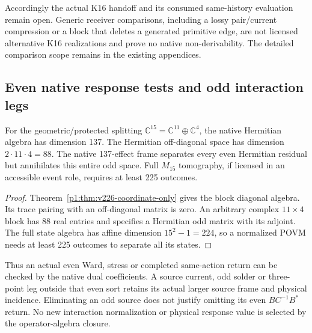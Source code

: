 \documentclass[12pt,a4paper]{article}
\begin{document}
Accordingly the actual K16 handoff and its consumed same-history evaluation
remain open. Generic receiver comparisons, including a lossy pair/current
compression or a block that deletes a generated primitive edge, are not
licensed alternative K16 realizations and prove no native non-derivability.
The detailed comparison scope remains in the existing appendices.





\subsection{Even native response tests and odd interaction legs}
\label{p5c:sec:v226-even-odd-tests}
\begin{proposition}
\label{p5c:prop:v226-even-odd-tests}
For the geometric/protected splitting $\mathbb C^{15}=\mathbb C^{11}
\oplus\mathbb C^4$, the native Hermitian algebra has dimension 137.
The Hermitian off-diagonal space has dimension $2\cdot11\cdot4=88$.
The native 137-effect frame separates every even Hermitian residual but
annihilates this entire odd space. Full $M_{15}$ tomography, if licensed
in an accessible event role, requires at least 225 outcomes.
\end{proposition}
\begin{proof}
Theorem~\ref{p1:thm:v226-coordinate-only} gives the block diagonal algebra.
Its trace pairing with an off-diagonal matrix is zero. An arbitrary complex
$11\times4$ block has 88 real entries and specifies a Hermitian odd matrix
with its adjoint. The full state algebra has affine dimension $15^2-1=224$,
so a normalized POVM needs at least 225 outcomes to separate all its states.
\end{proof}
Thus an actual even Ward, stress or completed same-action return can be
checked by the native dual coefficients. A source current, odd solder or
three-point leg outside that even sort retains its actual larger source
frame and physical incidence. Eliminating an odd source does not justify
omitting its even $BC^{-1}B^*$ return. No new interaction normalization or
physical response value is selected by the operator-algebra closure.

\end{document}
